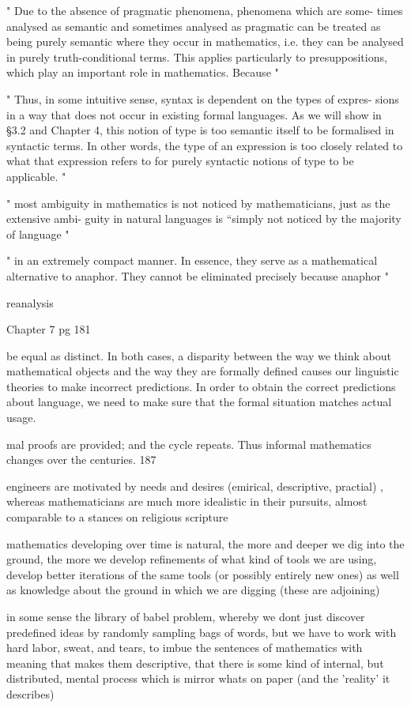 "
Due to the absence of pragmatic phenomena, phenomena which are some-
times analysed as semantic and sometimes analysed as pragmatic can be
treated as being purely semantic where they occur in mathematics, i.e. they
can be analysed in purely truth-conditional terms. This applies particularly
to presuppositions, which play an important role in mathematics. Because
"

"
Thus, in some intuitive sense, syntax is dependent on the types of expres-
sions in a way that does not occur in existing formal languages. As we will
show in §3.2 and Chapter 4, this notion of type is too semantic itself to be
formalised in syntactic terms. In other words, the type of an expression is too
closely related to what that expression refers to for purely syntactic notions
of type to be applicable.
"

"
most ambiguity in mathematics is not noticed by mathematicians, just as the extensive ambi-
guity in natural languages is “simply not noticed by the majority of language
"

"
in an extremely compact manner. In essence, they serve as a mathematical
alternative to anaphor. They cannot be eliminated precisely because anaphor
"

reanalysis

Chapter 7 pg 181

be equal as distinct. In both cases, a disparity between the way we think
about mathematical objects and the way they are formally defined causes
our linguistic theories to make incorrect predictions. In order to obtain the
correct predictions about language, we need to make sure that the formal
situation matches actual usage.

mal proofs are provided; and the cycle repeats. Thus informal mathematics
changes over the centuries. 187

engineers are motivated by needs and desires (emirical, descriptive,
practial) , whereas mathematicians are much more idealistic in their pursuits,
almost comparable to a stances on religious scripture

mathematics developing over time is natural, the more and deeper we dig into the
ground, the more we develop refinements of what kind of tools we are using,
develop better iterations of the same tools (or possibly entirely new ones) as
well as knowledge about the ground in which we are digging (these are adjoining)

in some sense the library of babel problem, whereby we dont just discover
predefined ideas by randomly sampling bags of words, but we have to work with
hard labor, sweat, and tears, to imbue the sentences of mathematics with meaning
that makes them descriptive, that there is some kind of internal, but
distributed, mental process which is mirror whats on paper (and the 'reality' it
describes)

